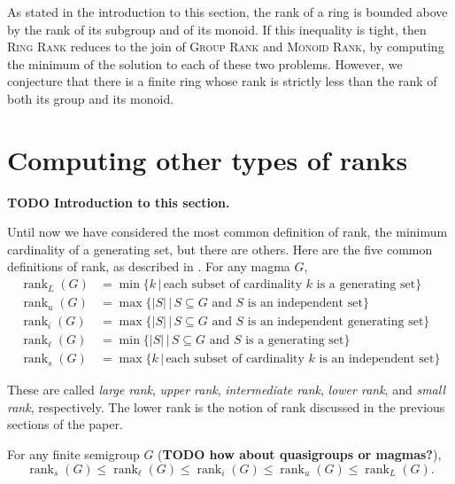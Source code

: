 \documentclass{article}
\newcommand{\todo}[1]{\textbf{TODO #1}}
\DeclareMathOperator{\rank}{rank}
\begin{document}
As stated in the introduction to this section, the rank of a ring is bounded above by the rank of its subgroup and of its monoid.
If this inequality is tight, then \textsc{Ring Rank} reduces to the join of \textsc{Group Rank} and \textsc{Monoid Rank}, by computing the minimum of the solution to each of these two problems.
However, we conjecture that there is a finite ring whose rank is strictly less than the rank of both its group and its monoid.

\section{Computing other types of ranks}

\todo{Introduction to this section.}

Until now we have considered the most common definition of rank, the minimum cardinality of a generating set, but there are others.
Here are the five common definitions of rank, as described in \autocite{hr99, hr00}.
For any magma $G$,
\begin{align*}
  \rank_L(G) & = \min \{ k \, | \, \text{each subset of cardinality } k \text{ is a generating set}\} \\
  \rank_u(G) & = \max \{ |S| \, | \, S \subseteq G \text{ and } S \text{ is an independent set} \} \\
  \rank_i(G) & = \max \{ |S| \, | \, S \subseteq G \text{ and } S \text{ is an independent generating set} \} \\
  \rank_\ell(G) & = \min \{ |S| \, | \, S \subseteq G \text{ and } S \text{ is a generating set} \} \\
  \rank_s(G) & = \max \{ k \, | \, \text{each subset of cardinality } k \text{ is an independent set} \}
\end{align*}

These are called \emph{large rank}, \emph{upper rank}, \emph{intermediate rank}, \emph{lower rank}, and \emph{small rank}, respectively.
The lower rank is the notion of rank discussed in the previous sections of the paper.
\begin{proposition}
  For any finite semigroup $G$ (\todo{how about quasigroups or magmas?}),
  \begin{equation*}
    \rank_s(G) \leq \rank_\ell(G) \leq \rank_i(G) \leq \rank_u(G) \leq \rank_L(G).
  \end{equation*}
\end{proposition}
\end{document}
